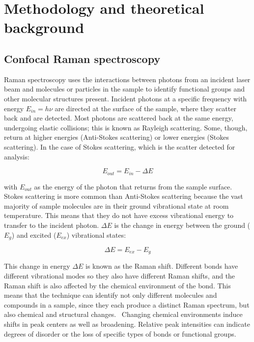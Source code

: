 \section[Methodology and theoretical background]{Methodology and theoretical background}
\label{section1.2}


\subsection[Confocal Raman spectroscopy]{Confocal Raman spectroscopy}
\label{subsection1.2.2}

Raman spectroscopy uses the interactions between photons from an incident laser beam and molecules or particles in the sample to identify functional groups and other molecular structures present. Incident photons at a specific frequency with energy $E_{in} = h\nu$ are directed at the surface of the sample, where they scatter back and are detected. Most photons are scattered back at the same energy, undergoing elastic collisions; this is known as Rayleigh scattering. Some, though, return at higher energies (Anti-Stokes scattering) or lower energies (Stokes scattering). In the case of Stokes scattering, which is the scatter detected for analysis:

\begin{equation} \label{eq:raman_1}
E_{out} = E_{in} - \Delta E
\end{equation}

with $E_{out}$ as the energy of the photon that returns from the sample surface. Stokes scattering is more common than Anti-Stokes scattering because the vast majority of sample molecules are in their ground vibrational state at room temperature. This means that they do not have excess vibrational energy to transfer to the incident photon. $\Delta E$ is the change in energy between the ground ($E_{g}$) and excited ($E_{ex}$) vibrational states:

\begin{equation} \label{eq:raman_2}
\Delta E = E_{ex} - E_{g}
\end{equation}

This change in energy $\Delta E$ is known as the Raman shift. Different bonds have different vibrational modes so they also have different Raman shifts, and the Raman shift is also affected by the chemical environment of the bond. This means that the technique can identify not only different molecules and compounds in a sample, since they each produce a distinct Raman spectrum, but also chemical and structural changes.~\autocite{2018RS,horiba,matousek_tissue} Changing chemical environments induce shifts in peak centers as well as broadening. Relative peak intensities can indicate degrees of disorder or the loss of specific types of bonds or functional groups.~\autocite{tomasini_raman}

